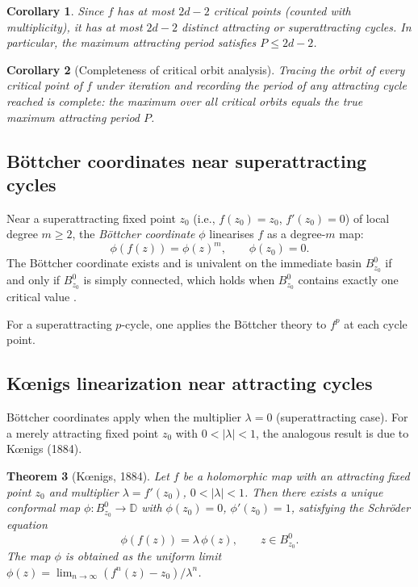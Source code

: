 \documentclass[12pt]{article}
\newtheorem{theorem}{Theorem}[section]
\newtheorem{corollary}[theorem]{Corollary}
\theoremstyle{definition}
\begin{document}
\begin{corollary}\label{cor:bound}
Since $f$ has at most $2d-2$ critical points (counted with multiplicity),
it has at most $2d-2$ distinct attracting or superattracting cycles.
In particular, the maximum attracting period satisfies $P\leq 2d-2$.
\end{corollary}

\begin{corollary}[Completeness of critical orbit analysis]\label{cor:complete}
Tracing the orbit of every critical point of $f$ under iteration and
recording the period of any attracting cycle reached is \emph{complete}:
the maximum over all critical orbits equals the true maximum attracting
period $P$.
\end{corollary}

\subsection{B\"ottcher coordinates near superattracting cycles}

Near a superattracting fixed point $z_0$ (i.e., $f(z_0)=z_0$,
$f'(z_0)=0$) of local degree $m\geq 2$, the \emph{B\"ottcher coordinate}
$\phi$ linearises $f$ as a degree-$m$ map:
\begin{equation}\label{eq:bottcher}
  \phi(f(z)) = \phi(z)^m, \qquad \phi(z_0)=0.
\end{equation}
The B\"ottcher coordinate exists and is univalent on the immediate basin
$B^0_{z_0}$ if and only if $B^0_{z_0}$ is simply connected, which holds
when $B^0_{z_0}$ contains exactly one critical value \cite{Milnor2006}.

For a superattracting $p$-cycle, one applies the B\"ottcher theory to
$f^p$ at each cycle point.

\subsection{K\oe nigs linearization near attracting cycles}
\label{subsec:koenigs}

Böttcher coordinates apply when the multiplier $\lambda=0$ (superattracting
case).  For a merely attracting fixed point $z_0$ with $0<|\lambda|<1$, the
analogous result is due to Kœnigs (1884).

\begin{theorem}[K\oe nigs, 1884]\label{thm:koenigs}
Let $f$ be a holomorphic map with an attracting fixed point $z_0$ and
multiplier $\lambda=f'(z_0)$, $0<|\lambda|<1$.  Then there exists a
unique conformal map $\phi\colon B^0_{z_0}\to\mathbb{D}$ with $\phi(z_0)=0$,
$\phi'(z_0)=1$, satisfying the Schröder equation
\begin{equation}\label{eq:koenigs}
  \phi(f(z)) = \lambda\,\phi(z), \qquad z\in B^0_{z_0}.
\end{equation}
The map $\phi$ is obtained as the uniform limit
$\phi(z) = \lim_{n\to\infty} (f^n(z)-z_0)/\lambda^n$.
\end{theorem}
\end{document}
